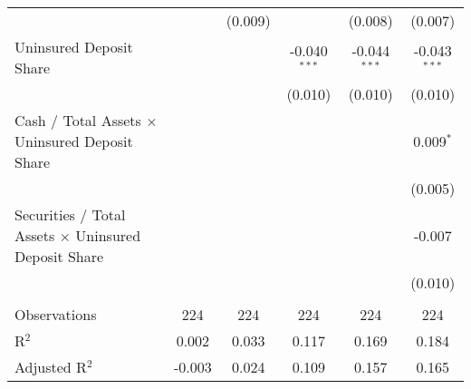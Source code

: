 \begin{table}[htbp]
\begin{adjustbox}{width = 1.2\textwidth, center}
\begin{tabular}{lccccc}
                                                                     &                & (0.009)        &                & (0.008)        & (0.007)\\   
         Uninsured Deposit Share                                     &                &                & -0.040$^{***}$ & -0.044$^{***}$ & -0.043$^{***}$\\   
                                                                     &                &                & (0.010)        & (0.010)        & (0.010)\\   
         Cash / Total Assets $\times$ Uninsured Deposit Share        &                &                &                &                & 0.009$^{*}$\\   
                                                                     &                &                &                &                & (0.005)\\   
         Securities / Total Assets $\times$ Uninsured Deposit Share  &                &                &                &                & -0.007\\   
                                                                     &                &                &                &                & (0.010)\\   
          \\
         Observations                                                & 224            & 224            & 224            & 224            & 224\\  
         R$^2$                                                       & 0.002          & 0.033          & 0.117          & 0.169          & 0.184\\  
         Adjusted R$^2$                                              & -0.003         & 0.024          & 0.109          & 0.157          & 0.165\\  
         \bottomrule
      \end{tabular}
   \end{adjustbox}
\end{table}


